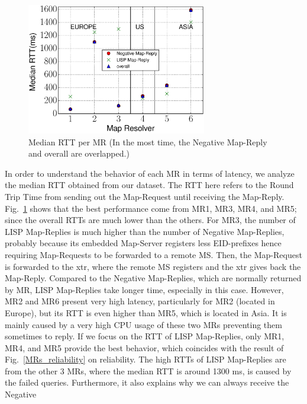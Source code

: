 \begin{figure}[!t]
	\centering
	\includegraphics[width=0.7\textwidth]{Pics/median_of_RTT.eps}
	\caption{Median RTT per MR (In the most time, the Negative Map-Reply and overall are overlapped.)}
	\label{median_rtt_per_map-resolver}
\end{figure}
In order to understand the behavior of each MR in terms of latency, we analyze
the median RTT obtained from our dataset. The RTT here refers to the Round Trip
Time from sending out the Map-Request until receiving the Map-Reply.
Fig.~\ref{median_rtt_per_map-resolver} shows that the best performance come
from MR1, MR3, MR4, and MR5; since the overall RTTs are much lower than
the others.  For MR3, the number of LISP Map-Replies is much higher than the
number of Negative Map-Replies, probably because its embedded Map-Server
registers less EID-prefixes hence requiring Map-Requests to be forwarded to a
remote MS. Then, the Map-Request is forwarded to the \acrshort{xtr}, where the remote MS
registers and the \acrshort{xtr} gives back the Map-Reply. Compared to the Negative
Map-Replies, which are normally returned by MR, LISP Map-Replies take longer
time, especially in this case. However, MR2 and MR6 present very high
latency, particularly for MR2 (located in Europe), but its RTT is even higher
than MR5, which is located in Asia. It is mainly caused by a very high CPU usage of these two MRs preventing them sometimes to reply.  
If we focus on the RTT of LISP Map-Replies, only MR1, MR4, and MR5 provide the best
behavior, which coincides with the result of Fig.~\ref{MRs_reliability} on
reliability. The high RTTs of LISP Map-Replies are from the other 3 MRs,
where the median RTT is around 1300 ms, is caused by the failed queries.
Furthermore, it also explains why we can always receive the Negative
